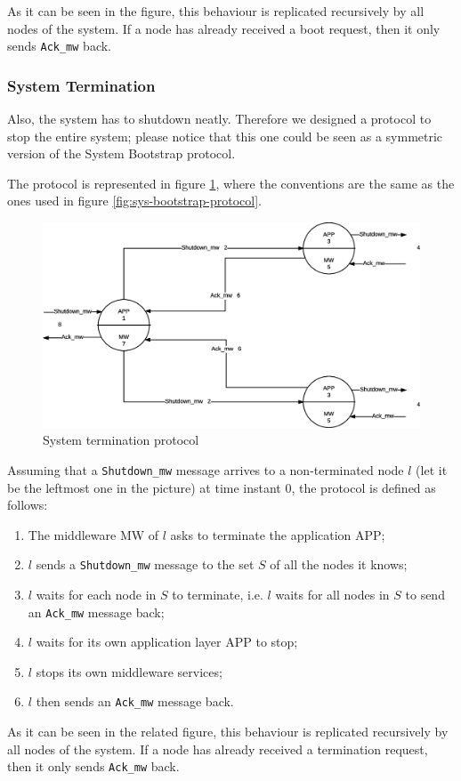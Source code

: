 As it can be seen in the figure, this behaviour is replicated recursively
by all nodes of the system. If a node has already received a boot request,
then it only sends \texttt{Ack\_mw} back.

\subsubsection{System Termination}
Also, the system has to shutdown neatly. Therefore we designed a protocol to
stop the entire system; please notice that this one could be seen as a
symmetric version of the System Bootstrap protocol.

The protocol is represented in figure \ref{fig:sys-termination-protocol}, where
the conventions are the same as the ones used in figure
\ref{fig:sys-bootstrap-protocol}.

\begin{figure}[H]
  \centering
  \includegraphics[width=\columnwidth]{images/solution/termination.eps}
  \caption{System termination protocol}
  \label{fig:sys-termination-protocol}
\end{figure}

Assuming that a \texttt{Shutdown\_mw} message arrives to a non-terminated node
$l$ (let it be the leftmost one in the picture) at time instant $0$, the
protocol is defined as follows:

\begin{enumerate}
\item The middleware MW of $l$ asks to terminate the application APP;
\item $l$ sends a \texttt{Shutdown\_mw} message to the set
  $S$ of all the nodes it knows;
\item $l$ waits for each node in $S$ to terminate, i.e. $l$ waits for all
  nodes in $S$ to send an \texttt{Ack\_mw} message back;
\item $l$ waits for its own application layer APP to stop;
\item $l$ stops its own middleware services;
\item $l$ then sends an \texttt{Ack\_mw} message back.
\end{enumerate}

As it can be seen in the related figure, this behaviour is replicated
recursively by all nodes of the system. If a node has already received a
termination request, then it only sends \texttt{Ack\_mw} back.
